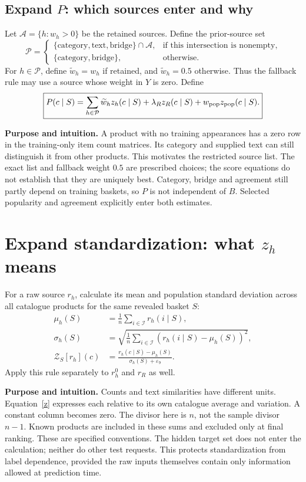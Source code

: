 \documentclass[11pt,a4paper]{article}
\newcommand{\I}{\mathcal I}\newcommand{\pos}[1]{\left[#1\right]_+}
\newcommand{\why}{\par\textbf{Purpose and intuition.} }
\numberwithin{equation}{section}
\begin{document}
\subsection{Expand $P$: which sources enter and why}
Let $\mathcal A=\{h:w_h>0\}$ be the retained sources. Define the prior-source set
\begin{equation}
\mathcal P=\begin{cases}
\{\mathrm{category,text,bridge}\}\cap\mathcal A,&\text{if this intersection is nonempty},\\
\{\mathrm{category,bridge}\},&\text{otherwise}.
\end{cases}
\end{equation}
For $h\in\mathcal P$, define $\widetilde w_h=w_h$ if retained, and $\widetilde w_h=0.5$
otherwise. Thus the fallback rule may use a source whose weight in $Y$ is zero. Define
\begin{equation}\label{prior}
\boxed{P(c\mid S)=\sum_{h\in\mathcal P}\widetilde w_hz_h(c\mid S)
+\lambda_R z_R(c\mid S)+w_{\rm pop}z_{\rm pop}(c\mid S).}
\end{equation}
\why A product with no training appearances has a zero row in the training-only item
count matrices. Its category and supplied text can still distinguish it from other products.
This motivates the restricted source list. The exact list and fallback weight $0.5$ are
prescribed choices; the score equations do not establish that they are uniquely best.
Category, bridge and agreement still partly depend on training baskets, so $P$ is not
independent of $B$. Selected popularity and agreement explicitly enter both estimates.

\section{Expand standardization: what $z_h$ means}\label{standard}
For a raw source $r_h$, calculate its mean and population standard deviation across all
catalogue products for the same revealed basket $S$:
\begin{align}
\mu_h(S)&=\frac1n\sum_{i\in\I}r_h(i\mid S),\\
\sigma_h(S)&=\sqrt{\frac1n\sum_{i\in\I}(r_h(i\mid S)-\mu_h(S))^2},\\
\mathcal Z_S[r_h](c)&=\frac{r_h(c\mid S)-\mu_h(S)}{\sigma_h(S)+\varepsilon_9}.\label{z}
\end{align}
Apply this rule separately to $r_h^0$ and $r_R$ as well.
\why Counts and text similarities have different units. Equation~\eqref{z} expresses each
relative to its own catalogue average and variation. A constant column becomes zero.
The divisor here is $n$, not the sample divisor $n-1$. Known products are included in
these sums and excluded only at final ranking. These are specified conventions.
The hidden target set does not enter the calculation; neither do other test requests.
This protects standardization from label dependence, provided the raw inputs themselves
contain only information allowed at prediction time.
\end{document}
